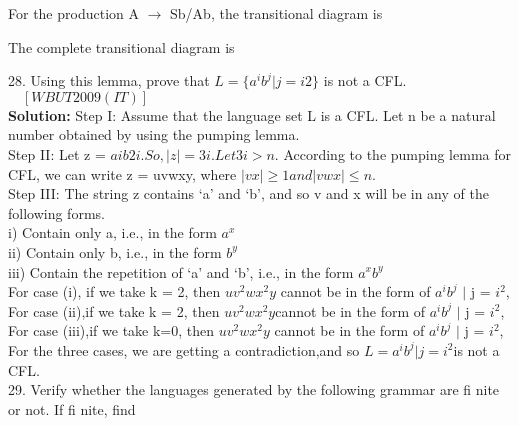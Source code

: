 \documentclass[12pt,a4paper]{book}
\begin{document}
For the production A $\to$ Sb/Ab, the transitional diagram is
\begin{center}
 \end{center}
The complete transitional diagram is
\begin{center}
 \end{center}
28. Using this lemma, prove that  $L =\{a^i b^j | j = i2\}$ is not a CFL.$\quad \left[ WBUT 2009 (IT)\right]$\\
\textbf{Solution:}
Step I: Assume that the language set L is a CFL. Let n be a natural number obtained by using the
pumping lemma.\\
Step II: Let z = $aib2i. So, | z | = 3i . Let 3i > n$. According to the pumping lemma for CFL, we can
write z = uvwxy, where $| vx | \geq 1 and | vwx | \leq n$.\\
Step III: The string z contains ‘a’ and ‘b’, and so v and x will be in any of the following forms.\\
i) Contain only a, i.e., in the form $a^x$\\
ii) Contain only b, i.e., in the form $b^y$\\
iii) Contain the repetition of ‘a’ and ‘b’, i.e., in the form $a^xb^y$\\
For case (i), if we take k = 2, then $uv^2wx^2y$ cannot be in the form of $a^i b^j$ $|$ j = $i^2$,\\
For case (ii),if we take k = 2, then $uv^2wx^2y$cannot be in the form of $a^i b^j$ $|$ j = $i^2$,\\
For case (iii),if we take k=0, then $uv^2wx^2y$ cannot be in the form of $a^i b^j$ $|$ j = $i^2$,\\
For the three cases, we are getting a contradiction,and so $L={a^i b^j | j = i^2}$is not a CFL.\\
29. Verify whether the languages generated by the following grammar are fi nite or not. If fi nite, find
\end{document}
